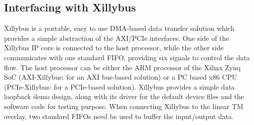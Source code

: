 

\subsection{Interfacing with Xillybus}
Xillybus is a portable, easy to use DMA-based data transfer solution which provides a simple abstraction of the AXI/PCIe interfaces. 
One side of the Xillybus IP core is connected to the host processor, while the other side communicates with one standard FIFO, providing six signals to control the data flow. 
The host processor can be either the ARM processor of the Xilinx Zynq SoC (AXI-Xillybus: for an AXI bus-based solution) or a PC based x86 CPU (PCIe-Xillybus: for a PCIe-based solution). 
Xillybus provides a simple data loopback demo design, along with its driver for the default device files and the software code for testing purpose. 
When connecting Xillybus to the linear TM overlay, two standard FIFOs need be used to buffer the input/output data. 




